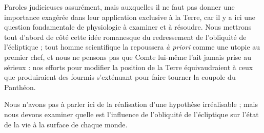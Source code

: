 \documentclass[a4paper, 11pt, oneside, landscape]{article}
\begin{document}
Paroles judicieuses assurément, mais auxquelles il ne faut pas donner une importance exagérée dans leur application exclusive à la Terre, car il y a ici une question fondamentale de physiologie à examiner et à résoudre. Nous mettrons tout d'abord de côté cette idée romanesque du redressement de l'obliquité de l'écliptique ; tout homme scientifique la repoussera \emph{à priori} comme une utopie au premier chef, et nous ne pensons pas que Comte lui-même l'ait jamais prise au sérieux : nos efforts pour modifier la position de la Terre équivaudraient à ceux que produiraient des fourmis s'exténuant pour faire tourner la coupole du Panthéon.

Nous n'avons pas à parler ici de la réalisation d'une hypothèse irréalisable ; mais nous devons examiner quelle est l'influence de l'obliquité de l'écliptique sur l'état de la vie à la surface de chaque monde.
\end{document}
